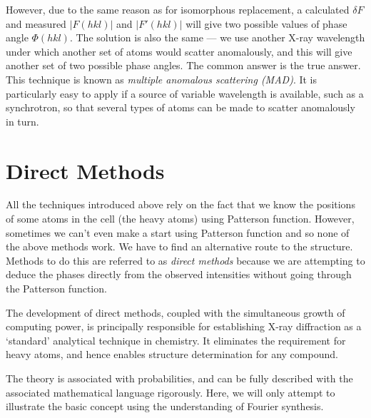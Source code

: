 \documentclass{article}
\theoremstyle{plain}\theoremheaderfont{\normalfont\itshape}\theorembodyfont{\rmfamily}\theoremseparator{.}\newtheorem*{rem}{Remark}\newtheorem*{ex}{Example}\newtheorem*{proof}{Proof}\newtheorem*{altp}{Alternative proof}
\theoremstyle{plain}\theoremheaderfont{\normalfont\bfseries}\theorembodyfont{\rmfamily}\theoremseparator{.}\newtheorem{thm}{Theorem}[section]\newtheorem{lem}[thm]{Lemma}\newtheorem{prop}[thm]{Proposition}\newtheorem*{cor}{Corollary}\newtheorem{defn}[thm]{Definition}\newtheorem{clm}[thm]{Claim}\newtheorem{clminproof}{Claim}\newtheorem*{law}{Law}\newtheorem{pos}[thm]{Postulate}
\theoremstyle{break}\theoremheaderfont{\normalfont\itshape}\theorembodyfont{\rmfamily}\theoremseparator{.\medskip}\newtheorem*{proofskip}{Proof}\newtheorem*{exs}{Examples}\newtheorem*{rems}{Remarks}
\theoremstyle{break}\theoremheaderfont{\normalfont\bfseries}\theorembodyfont{\rmfamily}\theoremseparator{.\medskip}\newtheorem{lemskip}[thm]{Lemma}\newtheorem{defnskip}[thm]{Definition}\newtheorem{propskip}[thm]{Proposition}\newtheorem{thmskip}[thm]{Theorem}
\numberwithin{equation}{section}
\newcommand{\abs}[1]{\left| #1 \right|}
\begin{document}
    However, due to the same reason as for isomorphous replacement, a calculated \(\delta F\) and measured \(\abs{F(hkl)}\) and \(\abs{F'(hkl)}\) will give two possible values of phase angle \(\Phi(hkl)\). The solution is also the same --- we use another X-ray wavelength under which another set of atoms would scatter anomalously, and this will give another set of two possible phase angles. The common answer is the true answer. This technique is known as \textit{multiple anomalous scattering (MAD)}. It is particularly easy to apply if a source of variable wavelength is available, such as a synchrotron, so that several types of atoms can be made to scatter anomalously in turn.

    \newpage
    \section{Direct Methods}
    All the techniques introduced above rely on the fact that we know the positions of some atoms in the cell (the heavy atoms) using Patterson function. However, sometimes we can't even make a start using Patterson function and so none of the above methods work. We have to find an alternative route to the structure. Methods to do this are referred to as \textit{direct methods} because we are attempting to deduce the phases directly from the observed intensities without going through the Patterson function.

    The development of direct methods, coupled with the simultaneous growth of computing power, is principally responsible for establishing X-ray diffraction as a `standard' analytical technique in chemistry. It eliminates the requirement for heavy atoms, and hence enables structure determination for any compound.

    The theory is associated with probabilities, and can be fully described with the associated mathematical language rigorously. Here, we will only attempt to illustrate the basic concept using the understanding of Fourier synthesis.
\end{document}
